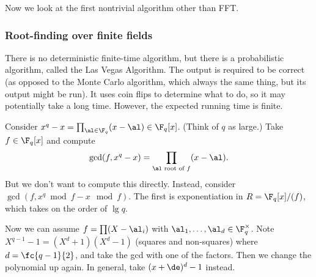 Now we look at the first nontrivial algorithm other than FFT.


\subsubsection{Root-finding over finite fields}
There is no deterministic finite-time algorithm, but there is a probabilistic algorithm, called the Las Vegas Algorithm. The output is required to be correct (as opposed to the Monte Carlo algorithm, which always the same thing, but its output might be run). It uses coin flips to determine what to do, so it may potentially take a long time. However, the expected running time is finite.

Consider $x^q-x=\prod_{\al\in \F_q}(x-\al)\in \F_q[x]$. (Think of $q$ as large.)
Take $f\in \F_q[x]$ and compute 
\[\gcd(f,x^q-x)=\prod_{\al \text{ root of }f}(x-\al).\]
But we don't want to compute this directly. Instead, consider $\gcd(f,x^q\bmod f-x\mod f)$. The first is exponentiation in $R=\F_q[x]/(f)$, which takes on the order of $\lg q$. %

Now we can assume $f=\prod(X-\al_i)$ with $\al_1,\ldots, \al_d\in \F_q^{\times}$. Note $X^{q-1}-1=(X^d+1)(X^d-1)$ (squares and non-squares) where $d=\fc{q-1}{2}$, and take the gcd with one of the factors. Then we change the polynomial up again. In general, take $(x+\de)^d-1$ instead. 

